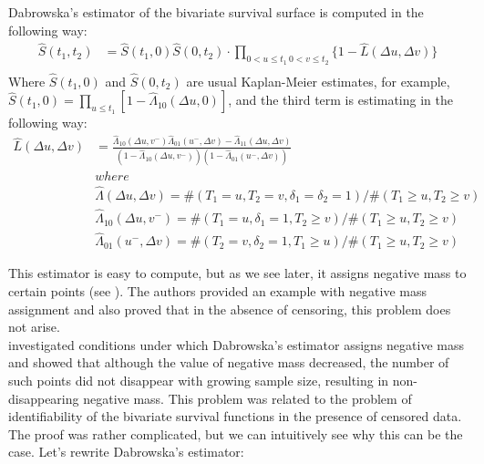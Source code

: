 \documentclass[]{article}
\begin{document}
Dabrowska's estimator of the bivariate survival surface is computed in the following way:
	$$
	\begin{aligned}
		\hat{S}(t_1,t_2) &= \hat{S}(t_1,0)\hat{S}(0,t_2)\cdot \prod_{{0<u\leq t_1~0<v\leq t_2}}\{1 - \hat{L}(\Delta u, \Delta v)\}\\
	\end{aligned}
	$$
Where $\hat{S}(t_1,0)$ and $\hat{S}(0,t_2)$ are usual Kaplan-Meier estimates, for example, $\hat{S}(t_1,0) = \prod_{u\leq t_1}[1-\hat{\Lambda}_{10}(\Delta u, 0)]$, and the third term is estimating in the following way:
	$$
	\begin{aligned}
    \hat{L}(\Delta u, \Delta v) &= \frac{\hat{\Lambda}_{10}(\Delta u,v^-)\hat{\Lambda}_{01}(u^-,\Delta v) - \hat{\Lambda}_{11}(\Delta u,\Delta v)}{\left(1-\hat{\Lambda}_{10}(\Delta u,v^-)\right)\left(1-\hat{\Lambda}_{01}(u^-,\Delta v)\right)}\\
  &where\\
	&\hat{\Lambda}(\Delta u, \Delta v) = \#(T_1=u, T_2=v, \delta_1=\delta_2=1)/\#(T_1\geq u, T_2\geq v)\\
	&\hat{\Lambda}_{10}(\Delta u, v^-) = \#(T_1=u, \delta_1=1, T_2\geq v)/\#(T_1\geq u, T_2\geq v)\\
	&\hat{\Lambda}_{01}(u^-,\Delta  v) = \#(T_2=v, \delta_2=1, T_1\geq u)/\#(T_1\geq u, T_2\geq v)
	\end{aligned}
	$$

This estimator is easy to compute, but as we see later, it assigns negative mass to certain points (see ). The authors provided an example with negative mass assignment and also proved that in the absence of censoring, this problem does not arise.\\

\cite{pruitt1991negative} investigated conditions under which Dabrowska's estimator assigns negative mass and showed that although the value of negative mass decreased, the number of such points did not disappear with growing sample size, resulting in non-disappearing negative mass. This problem was related to the problem of identifiability of the bivariate survival functions in the presence of censored data. The proof was rather complicated, but we can intuitively see why this can be the case. Let's rewrite Dabrowska's estimator:
\end{document}
